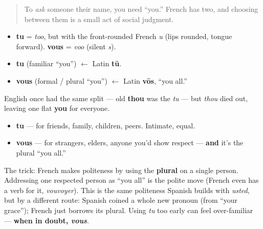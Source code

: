 \label{lesson:FR-C02-tu-vous}



\begin{quote}
To \emph{ask} someone their name, you need \textquotedblleft{}you.\textquotedblright{} French has two, and choosing between them is a small act of social judgment.
\end{quote}

\begin{sounds}
\begin{itemize}
\raggedright
  \item \textbf{tu} = \emph{too}, but with the front-rounded French \emph{u} (lips rounded, tongue forward). \textbf{vous} = \emph{voo} (silent \emph{s}).
\end{itemize}
\end{sounds}

\begin{cousinweb}
\begin{itemize}
\raggedright
  \item \textbf{tu} (familiar \textquotedblleft{}you\textquotedblright{}) $\leftarrow$ Latin \textbf{tū}.
  \item \textbf{vous} (formal / plural \textquotedblleft{}you\textquotedblright{}) $\leftarrow$ Latin \textbf{vōs}, \textquotedblleft{}you all.\textquotedblright{}
\end{itemize}

English once had the same split — old \textbf{thou} was the \emph{tu} — but \emph{thou} died out, leaving one flat \textbf{you} for everyone.
\end{cousinweb}

\begin{grammarlens}[title={Grammar Lens: two \textquotedblleft{}you\textquotedblright{}s, chosen by register}]
\begin{itemize}
\raggedright
  \item \textbf{tu} — for friends, family, children, peers. Intimate, equal.
  \item \textbf{vous} — for strangers, elders, anyone you'd show respect — \textbf{and} it's the plural \textquotedblleft{}you all.\textquotedblright{}
\end{itemize}

The trick: French makes politeness by using the \textbf{plural} on a single person. Addressing one respected person as \textquotedblleft{}you all\textquotedblright{} is the polite move (French even has a verb for it, \emph{vouvoyer}). This is the same politeness Spanish builds with \emph{usted}, but by a different route: Spanish coined a whole new pronoun (from \textquotedblleft{}your grace\textquotedblright{}); French just borrows its plural. Using \emph{tu} too early can feel over-familiar — \textbf{when in doubt, \emph{vous}}.
\end{grammarlens}

